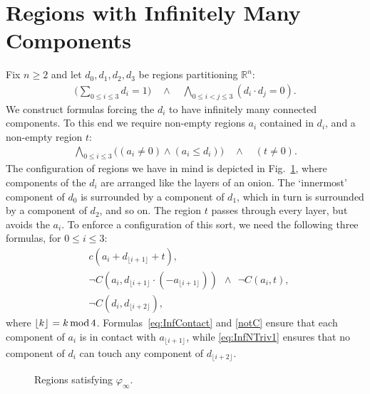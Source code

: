 \documentclass{article}
\newcommand{\R}{\mathbb{R}}
\newcommand{\md}[2][] {{\lfloor#2\rfloor_{#1}}}
\renewcommand{\phi}{\varphi}
\begin{document}
\section{Regions with Infinitely Many Components}\label{sec:sensitivity}

Fix $n \ge 2$ and let $d_0,d_1,d_2,d_3$ be regions partitioning $\R^n$:
\begin{align}
\label{eq:InfPart1}
\textstyle \big( \sum_{0 \leq i \le 3} d_i =1 \big) \quad\land\quad \bigwedge_{0 \leq i<j\leq3}(d_i\cdot d_j=0).	\end{align}
We construct formulas forcing the $d_i$ to have infinitely many
connected components. To this end we require non-empty regions $a_i$
contained in $d_i$, and a non-empty region $t$:
\begin{align}\label{eq:basic-regions}
\textstyle\bigwedge_{0 \leq i \leq 3} \bigl((a_i \ne 0) \land (a_i \leq d_i)\bigr) \quad\land\quad (t\ne 0).
\end{align}
The configuration of regions we have in mind is depicted in
Fig.~\ref{fig:InfCmpSat}, where components of the $d_i$ are arranged
like the layers of an onion. The `innermost' component of $d_0$ is
surrounded by a component of $d_1$, which in turn is surrounded by a
component of $d_2$, and so on. The region $t$ passes through every
layer, but avoids the $a_i$. To enforce a configuration of this sort,
we need the following three formulas, for $0 \leq i \leq 3$:
\begin{align}
\label{eq:InfContact}	&c(a_i+d_{\md{i+1}}+t),	 \\
\label{notC}	&\neg C(a_i,d_{\md{i+1}}\cdot (-a_{\md{i+1}})) \ \ \land \ \ \neg C(a_i, t), \\
\label{eq:InfNTriv1}    &\neg C(d_i, d_{\md{i+2}}),
\end{align}
where $\md{k}= k\, {\rm mod}\, 4$. Formulas~\eqref{eq:InfContact} and
\eqref{notC} ensure that each component of $a_i$ is in contact with
$a_{\md{i+1}}$, while \eqref{eq:InfNTriv1} ensures that no component of
$d_i$ can touch any component of $d_{\md{i+2}}$.
\begin{figure}[h]
\begin{center}
\end{center}
\vspace*{-2mm}
\caption{Regions satisfying $\phi_\infty$.}\label{fig:InfCmpSat}	
\end{figure}
\end{document}
